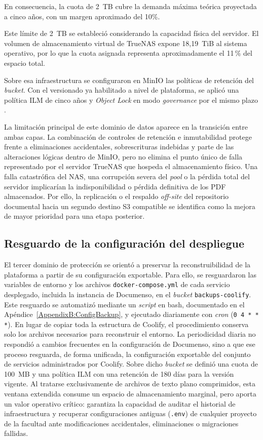 En consecuencia, la cuota de 2~TB cubre la demanda máxima teórica proyectada a cinco años, con un margen aproximado del 10\%.

Este límite de 2~TB se estableció considerando la capacidad física del servidor. El volumen de almacenamiento virtual de TrueNAS expone 18,19~TiB al sistema operativo, por lo que la cuota asignada representa aproximadamente el 11\,\% del espacio total.

Sobre esa infraestructura se configuraron en MinIO las políticas de retención del \textit{bucket}. Con el versionado ya habilitado a nivel de plataforma, se aplicó una política ILM de cinco años \cite{minio_ilm_rule_add} y \textit{Object Lock} en modo \textit{governance} por el mismo plazo \cite{minio_object_locking}.

La limitación principal de este dominio de datos aparece en la transición entre ambas capas. La combinación de controles de retención e inmutabilidad protege frente a eliminaciones accidentales, sobrescrituras indebidas y parte de las alteraciones lógicas dentro de MinIO, pero no elimina el punto único de falla representado por el servidor TrueNAS que hospeda el almacenamiento físico. Una falla catastrófica del NAS, una corrupción severa del \textit{pool} o la pérdida total del servidor implicarían la indisponibilidad o pérdida definitiva de los PDF almacenados. Por ello, la replicación o el respaldo \textit{off-site} del repositorio documental hacia un segundo destino S3 compatible se identifica como la mejora de mayor prioridad para una etapa posterior.

\subsection{Resguardo de la configuración del despliegue}

El tercer dominio de protección se orientó a preservar la reconstruibilidad de la plataforma a partir de su configuración exportable. Para ello, se resguardaron las variables de entorno y los archivos \texttt{docker-compose.yml} de cada servicio desplegado, incluida la instancia de Documenso, en el \textit{bucket} \texttt{backups-coolify}. Este resguardo se automatizó mediante un \textit{script} en bash, documentado en el Apéndice~\ref{AppendixB:ConfigBackup}, y ejecutado diariamente con \textit{cron} (\texttt{0 4 * * *}). En lugar de copiar toda la estructura de Coolify, el procedimiento conserva solo los archivos necesarios para reconstruir el entorno. La periodicidad diaria no respondió a cambios frecuentes en la configuración de Documenso, sino a que ese proceso resguarda, de forma unificada, la configuración exportable del conjunto de servicios administrados por Coolify. Sobre dicho \textit{bucket} se definió una cuota de 100~MB y una política ILM con una retención de 180 días para la versión vigente. Al tratarse exclusivamente de archivos de texto plano comprimidos, esta ventana extendida consume un espacio de almacenamiento marginal, pero aporta un valor operativo crítico: garantiza la capacidad de auditar el historial de infraestructura y recuperar configuraciones antiguas (\texttt{.env}) de cualquier proyecto de la facultad ante modificaciones accidentales, eliminaciones o migraciones fallidas.

